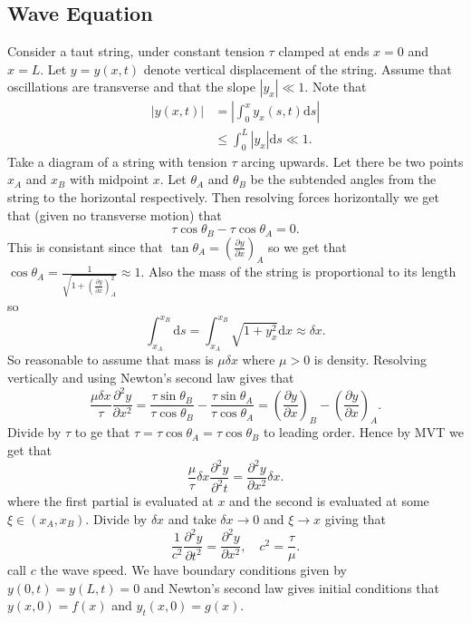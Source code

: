 \documentclass{article}
\begin{document}
\subsection{Wave Equation}
Consider a taut string, under constant tension $ \tau $ clamped at ends $ x=0 $ and $ x=L $. Let $ y =y(x,t)$ denote vertical displacement of the string. Assume that oscillations are transverse and that the slope $ |y_x|\ll 1 $. Note that
\begin{align*}
|y(x,t)|&=\left|\int_0^x y_x(s,t)\mathrm ds\right|\\
	&\le \int_0^L |y_x|\mathrm ds \ll 1.
\end{align*}
Take a diagram of a string with tension $ \tau $ arcing upwards. Let there be two points $ x_A $ and $ x_B $ with midpoint $ x $. Let $ \theta_A $ and $ \theta_B $ be the subtended angles from the string to the horizontal respectively. Then resolving forces horizontally we get that (given no transverse motion) that
\[
  \tau\cos\theta_B-\tau\cos\theta_A=0.
\]
This is consistant since that $ \tan\theta_A=\left(\frac{\partial y}{\partial x}\right)_A $ so we get that $ \cos\theta_A=\frac1{\sqrt{1+(\frac{\partial y}{\partial x})_A^2}}\approx 1 $. Also the mass of the string is proportional to its length so
\[
	\int_{x_A}^{x_B}\mathrm ds=\int_{x_A}^{x_B}\sqrt{1+y_x^2}\mathrm dx\approx \delta x.
\]
So reasonable to assume that mass is $ \mu\delta x $ where $ \mu>0 $ is density. Resolving vertically and using Newton's second law gives that
\[
	\frac{\mu\delta x}{\tau}\frac{\partial^2y}{\partial x^2}=\frac{\tau\sin\theta_B}{\tau\cos\theta_B}-\frac{\tau\sin\theta_A}{\tau\cos\theta_A}=\left(\frac{\partial y}{\partial x}\right)_B-\left(\frac{\partial y}{\partial x}\right)_A.
\]
Divide by $ \tau $ to ge that $ \tau=\tau\cos\theta_A=\tau\cos\theta_B $ to leading order. Hence by MVT we get that
\[
	\frac{\mu}\tau\delta x\frac{\partial ^2y}{\partial^2t}=\frac{\partial^2y}{\partial x^2}\delta x.
\]
where the first partial is evaluated at $ x $ and the second is evaluated at some $ \xi\in (x_A,x_B) $. Divide by $ \delta x $ and take $ \delta x\to 0 $ and $ \xi\to x $ giving that 
\[
	\frac 1{c^2}\frac{\partial^2y}{\partial t^2}=\frac{\partial ^2y}{\partial x^2},\quad c^2=\frac \tau\mu.
\]
call $ c $ the wave speed. We have boundary conditions given by $ y(0,t)=y(L,t)=0 $ and Newton's second law gives initial conditions that $ y(x,0)=f(x) $ and $ y_t(x,0)=g(x) $.
\end{document}
